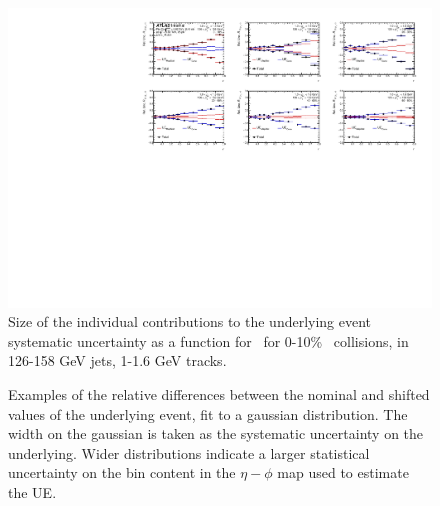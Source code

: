 \begin{figure}
\centerline{\includegraphics[page=1,width=1.\textwidth]{figures/main/systematics/Summary_UE_RDpT_dR_sys_error}}
    \caption{Size of the individual contributions to the underlying event systematic uncertainty as a function for \rvar\ for 0-10\% \pbpb\ collisions, in 126-158 GeV jets, 1-1.6 GeV tracks.}
    \label{fig:UE_sys_contrib}
\end{figure}

\begin{figure}
   \caption{Examples of the relative differences between the nominal and shifted values of the underlying event, fit to a gaussian distribution. The width on the gaussian is taken as the systematic uncertainty on the underlying. Wider distributions indicate a larger statistical uncertainty on the bin content in the $\eta-\phi$ map used to estimate the UE.}
      \label{fig:gaus_diff}
\end{figure}

